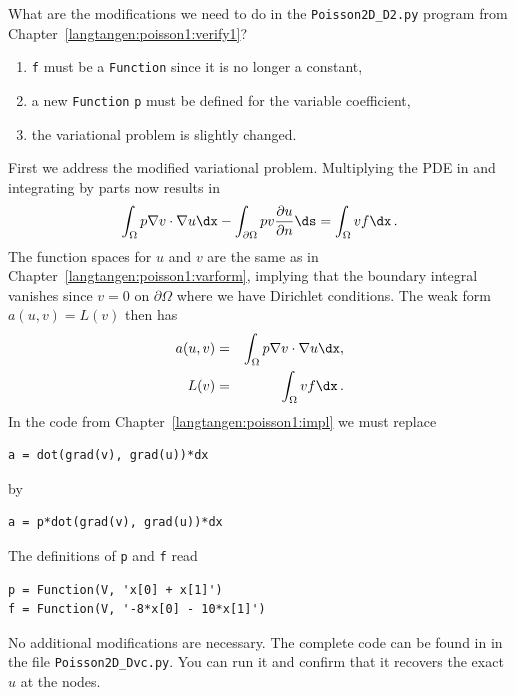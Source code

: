 What are the modifications we need to do in the {\fontsize{12pt}{12pt}\verb!Poisson2D_D2.py!} program
from Chapter~\ref{langtangen:poisson1:verify1}?
\begin{enumerate}
\item {\fontsize{12pt}{12pt}\texttt{f}} must be a {\fontsize{12pt}{12pt}\texttt{Function}} since it is no longer a constant,
\item a new {\fontsize{12pt}{12pt}\texttt{Function}} {\fontsize{12pt}{12pt}\texttt{p}} must be defined for the variable coefficient,
\item the variational problem is slightly changed.
\end{enumerate}
First we address the modified variational problem. Multiplying
the PDE in  and
integrating by parts now results
in
\[ \int_\Omega p\nabla v\cdot\nabla u\dx -
\int_{\partial\Omega} pv{\partial u\over
\partial n}\ds = \int_\Omega vf\dx\langtangenep\]
The function spaces for $u$ and $v$ are the same as in
Chapter~\ref{langtangen:poisson1:varform}, implying that the boundary integral
vanishes since $v=0$ on $\partial\Omega$ where we have Dirichlet conditions.
The weak form $a(u,v)=L(v)$ then has
\begin{eqnarray}
a(u,v) &=& \int_\Omega p\nabla v\cdot\nabla u\dx,\\
L(v) &=& \int_\Omega vf\dx\langtangenep
\end{eqnarray}
In the code from Chapter~\ref{langtangen:poisson1:impl} we must replace
\begin{Verbatim}[fontsize=\fontsize{10pt}{10pt},tabsize=8,baselinestretch=1.05,
fontfamily=tt,xleftmargin=7mm]
a = dot(grad(v), grad(u))*dx
\end{Verbatim}
\noindent
by
\begin{Verbatim}[fontsize=\fontsize{10pt}{10pt},tabsize=8,baselinestretch=1.05,
fontfamily=tt,xleftmargin=7mm]
a = p*dot(grad(v), grad(u))*dx
\end{Verbatim}
\noindent
The definitions of {\fontsize{12pt}{12pt}\texttt{p}} and {\fontsize{12pt}{12pt}\texttt{f}} read
\begin{Verbatim}[fontsize=\fontsize{10pt}{10pt},tabsize=8,baselinestretch=1.05,
fontfamily=tt,xleftmargin=7mm]
p = Function(V, 'x[0] + x[1]')
f = Function(V, '-8*x[0] - 10*x[1]')
\end{Verbatim}
\noindent
No additional modifications are necessary. The complete code can be
found in in the file {\fontsize{12pt}{12pt}\verb!Poisson2D_Dvc.py!}. You can run it and confirm
that it recovers the exact $u$ at the nodes.

